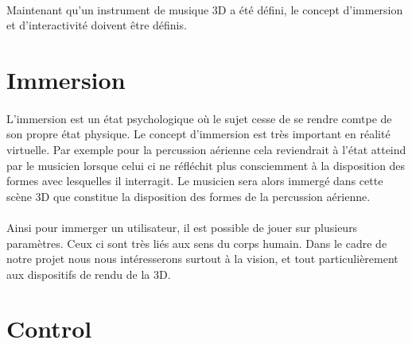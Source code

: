 \paragraph{}
Maintenant qu'un instrument de musique 3D a été défini, le concept d'immersion et d'interactivité doivent être définis.
\newpage
\section{Immersion}

\paragraph{}
L'immersion est un état psychologique où le sujet cesse de se rendre comtpe de son propre état physique. Le concept d'immersion est très important en réalité virtuelle. Par exemple pour la percussion aérienne cela reviendrait à l'état atteind par le musicien lorsque celui ci ne réfléchit plus consciemment à la disposition des formes avec lesquelles il interragit. Le musicien sera alors immergé dans cette scène 3D que constitue la disposition des formes de la percussion aérienne.

\paragraph{}
Ainsi pour immerger un utilisateur, il est possible de jouer sur plusieurs paramètres. Ceux ci sont très liés aux sens du corps humain. Dans le cadre de notre projet nous nous intéresserons surtout à la vision, et tout particulièrement aux dispositifs de rendu de la 3D.



\section{Control}